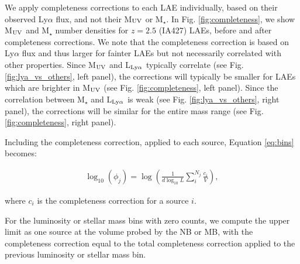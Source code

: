 \documentclass[a4paper,fleqn,usenatbib]{mnras}
\begin{document}
We apply completeness corrections to each LAE individually, based on their observed Ly$\alpha$ flux, and not their M$_{\rm UV}$ or M$_\star$. In Fig. \ref{fig:completeness}, we show M$_{\rm UV}$ and M$_\star$ number densities for $z=2.5$ (IA427) LAEs, before and after completeness corrections. We note that the completeness correction is based on Ly$\alpha$ flux and thus larger for fainter LAEs but not necessarily correlated with other properties. Since M$_{\rm UV}$ and L$_{\rm Ly\alpha}$ typically correlate (see Fig. \ref{fig:lya_vs_others}, left panel), the corrections will typically be smaller for LAEs which are brighter in M$_{\rm UV}$ (see Fig. \ref{fig:completeness}, left panel). Since the correlation between M$_\star$ and L$_{\rm Ly\alpha}$ is weak (see Fig. \ref{fig:lya_vs_others}, right panel), the corrections will be similar for the entire mass range (see Fig. \ref{fig:completeness}, right panel).

Including the completeness correction, applied to each source, Equation \ref{eq:bins} becomes:

\begin{eqnarray}
\log_{10}(\phi_j)=\log\left(\frac{1}{d\log_{10} L}\sum_i^{N_j}\frac{c_i}{V}\right),
\label{eq:bins_cor}
\end{eqnarray} 

\noindent where $c_i$ is the completeness correction for a source $i$.

For the luminosity or stellar mass bins with zero counts, we compute the upper limit as one source at the volume probed by the NB or MB, with the completeness correction equal to the total completeness correction applied to the previous luminosity or stellar mass bin.
\end{document}
